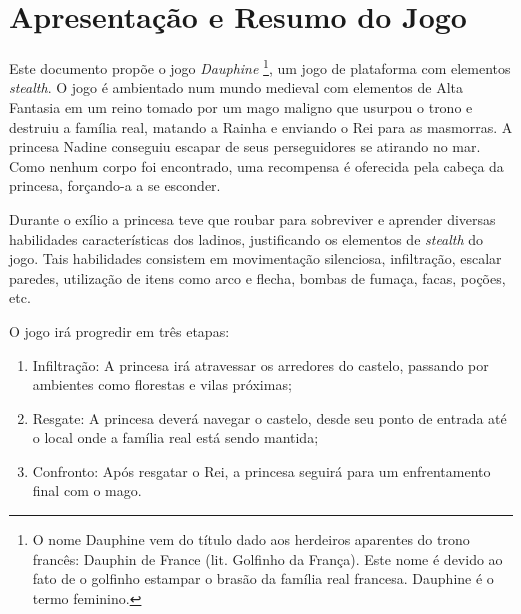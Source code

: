 \AddToShipoutPicture{\BackgroundPic}

\section*{Apresentação e Resumo do Jogo}

Este documento propõe o jogo \emph{Dauphine} \footnote{O nome Dauphine vem do título dado aos herdeiros aparentes do trono francês: Dauphin de France (lit. Golfinho da França). Este nome é devido ao fato de o golfinho estampar o brasão da família real francesa. Dauphine é o termo feminino.}, um jogo de plataforma com elementos \emph{stealth}. O jogo é ambientado num mundo medieval com elementos de Alta Fantasia em um reino  tomado por um mago maligno que usurpou o trono e destruiu a família real, matando a Rainha e enviando o Rei para as masmorras. A princesa Nadine conseguiu escapar de seus perseguidores se atirando no mar. Como nenhum corpo foi encontrado, uma recompensa é oferecida pela cabeça da princesa, forçando-a a se esconder. 

Durante o exílio a princesa teve que roubar para sobreviver e aprender diversas habilidades características dos ladinos, justificando os elementos de \emph{stealth} do jogo. Tais habilidades consistem em movimentação silenciosa, infiltração, escalar paredes, utilização de itens como arco e flecha, bombas de fumaça, facas, poções, etc.

O jogo irá progredir em três etapas:
\begin{enumerate}
	\item Infiltração: A princesa irá atravessar os arredores do castelo, passando por ambientes como florestas e vilas próximas;
	\item Resgate: A princesa deverá navegar o castelo, desde seu ponto de entrada até o local onde a família real está sendo mantida;
	\item Confronto: Após resgatar o Rei, a princesa seguirá para um enfrentamento final com o mago.
\end{enumerate}


